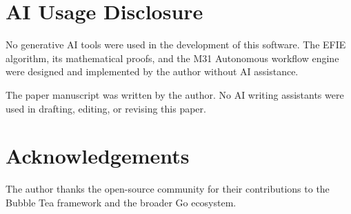 \documentclass[11pt]{article}
\begin{document}
\section{AI Usage Disclosure}

No generative AI tools were used in the development of this software. The EFIE algorithm, its mathematical proofs, and the M31 Autonomous workflow engine were designed and implemented by the author without AI assistance.

The paper manuscript was written by the author. No AI writing assistants were used in drafting, editing, or revising this paper.

\section*{Acknowledgements}

The author thanks the open-source community for their contributions to the Bubble Tea framework and the broader Go ecosystem.



\end{document}
